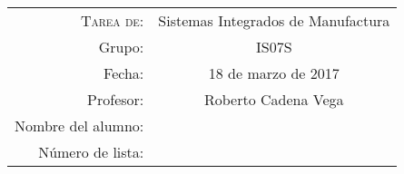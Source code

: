 



\title{\normalfont \normalsize \vspace{-6ex}
\begin{center}
	\begin{tabular}{r c}
		\textsc{Tarea de:} & Sistemas Integrados de Manufactura \\
		Grupo: & IS07S \\
		Fecha: & 18 de marzo de 2017 \\
		Profesor: & Roberto Cadena Vega \\
		Nombre del alumno: & \underline{\hspace{11cm}} \\
		Número de lista: & \underline{\hspace{2.5cm}}
	\end{tabular}
\end{center}
}

\date{}
\author{}




\maketitle %

\begin{center}
\end{center}

